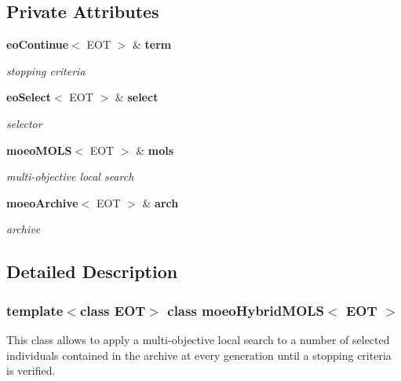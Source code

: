 \subsection*{Private Attributes}
\begin{CompactItemize}
\item 
{\bf eo\-Continue}$<$ EOT $>$ \& {\bf term}\label{classmoeoHybridMOLS_cd05dc1c82febb819945663c3b5c6a75}

\begin{CompactList}\small\item\em stopping criteria \item\end{CompactList}\item 
{\bf eo\-Select}$<$ EOT $>$ \& {\bf select}\label{classmoeoHybridMOLS_b47c4d1bce77c5648b437a5884a7c41f}

\begin{CompactList}\small\item\em selector \item\end{CompactList}\item 
{\bf moeo\-MOLS}$<$ EOT $>$ \& {\bf mols}\label{classmoeoHybridMOLS_5ecf318c321a71857c11da1ff5000092}

\begin{CompactList}\small\item\em multi-objective local search \item\end{CompactList}\item 
{\bf moeo\-Archive}$<$ EOT $>$ \& {\bf arch}\label{classmoeoHybridMOLS_4aecb1f300f2f09b8d45998cc140576b}

\begin{CompactList}\small\item\em archive \item\end{CompactList}\end{CompactItemize}


\subsection{Detailed Description}
\subsubsection*{template$<$class EOT$>$ class moeo\-Hybrid\-MOLS$<$ EOT $>$}

This class allows to apply a multi-objective local search to a number of selected individuals contained in the archive at every generation until a stopping criteria is verified. 



